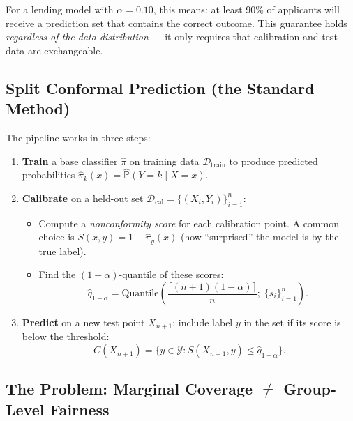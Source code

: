 \documentclass[11pt,a4paper]{article}
\begin{document}
\begin{keyinsight}
For a lending model with $\alpha = 0.10$, this means: at least 90\% of applicants will receive a prediction set that contains the correct outcome. This guarantee holds \emph{regardless of the data distribution} --- it only requires that calibration and test data are exchangeable.
\end{keyinsight}

\subsection{Split Conformal Prediction (the Standard Method)}

The pipeline works in three steps:

\begin{enumerate}[leftmargin=2em]
    \item \textbf{Train} a base classifier $\hat{\pi}$ on training data $\mathcal{D}_{\text{train}}$ to produce predicted probabilities $\hat{\pi}_k(x) = \hat{\mathbb{P}}(Y=k \mid X=x)$.
    \item \textbf{Calibrate} on a held-out set $\mathcal{D}_{\text{cal}} = \{(X_i, Y_i)\}_{i=1}^n$:
    \begin{itemize}
        \item Compute a \emph{nonconformity score} for each calibration point. A common choice is $S(x,y) = 1 - \hat{\pi}_y(x)$ (how ``surprised'' the model is by the true label).
        \item Find the $(1-\alpha)$-quantile of these scores:
        \begin{equation}
        \hat{q}_{1-\alpha} = \text{Quantile}\!\left(\frac{\lceil(n+1)(1-\alpha)\rceil}{n};\;\{s_i\}_{i=1}^n\right).
        \end{equation}
    \end{itemize}
    \item \textbf{Predict} on a new test point $X_{n+1}$: include label $y$ in the set if its score is below the threshold:
    \begin{equation}
    C(X_{n+1}) = \bigl\{y \in \mathcal{Y} : S(X_{n+1}, y) \le \hat{q}_{1-\alpha}\bigr\}.
    \end{equation}
\end{enumerate}

\subsection{The Problem: Marginal Coverage $\neq$ Group-Level Fairness}
\end{document}
